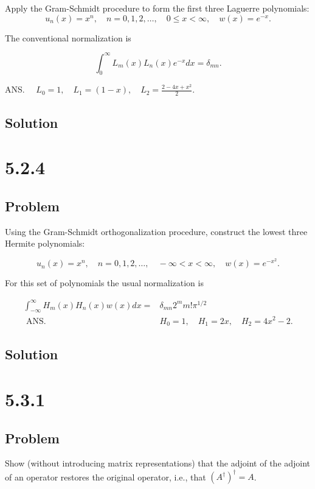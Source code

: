 \documentclass[12pt]{article}
\begin{document}
Apply the Gram-Schmidt procedure to form the first three Laguerre polynomials:
\[
u_n(x)=x^n, \quad n=0,1,2, \ldots, \quad 0 \leq x<\infty, \quad w(x)=e^{-x} .
\]

The conventional normalization is

\[
\int_0^{\infty} L_m(x) L_n(x) e^{-x} d x=\delta_{m n} .
\]

ANS. \(\quad L_0=1, \quad L_1=(1-x), \quad L_2=\frac{2-4 x+x^2}{2}\).

\subsection{Solution}

\newpage
\section{5.2.4}

\subsection{Problem}

Using the Gram-Schmidt orthogonalization procedure, construct the lowest three Hermite polynomials:

\[
u_n(x)=x^n, \quad n=0,1,2, \ldots, \quad-\infty<x<\infty, \quad w(x)=e^{-x^2} .
\]

For this set of polynomials the usual normalization is

\[
\begin{aligned}
\int_{-\infty}^{\infty} H_m(x) H_n(x) w(x) d x= & \delta_{m n} 2^m m!\pi^{1 / 2} \\
\text { ANS. } & H_0=1, \quad H_1=2 x, \quad H_2=4 x^2-2 .
\end{aligned}
\]

\subsection{Solution}

\newpage
\section{5.3.1}

\subsection{Problem}

Show (without introducing matrix representations) that the adjoint of the adjoint of an operator restores the original operator, i.e., that \({\left(A^{\dagger}\right)}^{\dagger}=A\).
\end{document}
